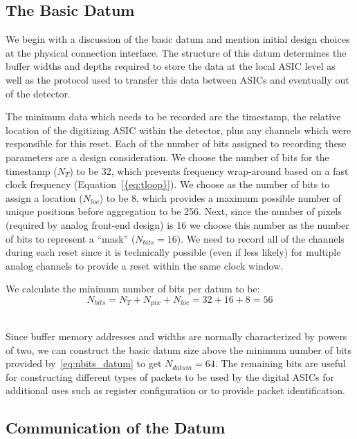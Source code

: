 \subsection{The Basic Datum}

We begin with a discussion of the basic datum and mention initial design choices at the physical connection interface.
The structure of this datum determines the buffer widths and depths required to store the data at the local ASIC level as well as the protocol used to transfer this data between ASICs and eventually out of the detector.

The minimum data which needs to be recorded are the timestamp, the relative location of the digitizing ASIC within the detector, plus any channels which were responsible for this reset.
Each of the number of bits assigned to recording these parameters are a design consideration.
We choose the number of bits for the timestamp ($N_{T}$) to be 32, which prevents frequency wrap-around based on a fast clock frequency (Equation~\ref{{eq:tloop}}).
We choose as the number of bits to assign a location ($N_{loc}$) to be 8, which provides a maximum possible number of unique positions before aggregation to be 256.
Next, since the number of pixels (required by analog front-end design) is 16 we choose this number as the number of bits to represent a ``mask'' ($N_{bits} = 16$).
We need to record all of the channels during each reset since it is technically possible (even if less likely) for multiple analog channels to provide a reset within the same clock window.

We calculate the minimum number of bits per datum to be:
\begin{equation}
  N_{bits} = N_{T} + N_{pix} + N_{loc} = 32 + 16 + 8 = 56
\end{equation}~\label{eq:nbits_datum}

Since buffer memory addresses and widths are normally characterized by powers of two, we can construct the basic datum size above the minimum number of bits provided by~\ref{eq:nbits_datum} to get $N_{datum} = 64$.
The remaining bits are useful for constructing different types of packets to be used by the digital ASICs for additional uses such as register configuration or to provide packet identification.

\subsection{Communication of the Datum}~\label{sec:comms}

